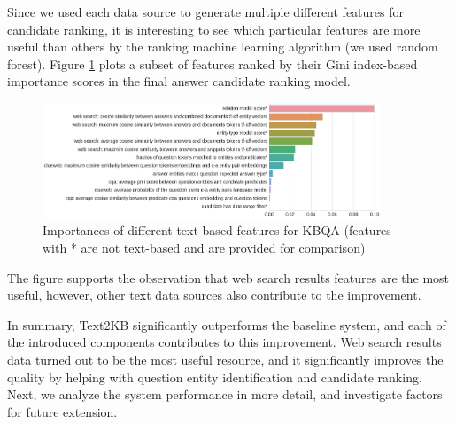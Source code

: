 
Since we used each data source to generate multiple different features for candidate ranking, it is interesting to see which particular features are  more useful than others by the ranking machine learning algorithm (we used random forest).
Figure \ref{fig:feature_importances} plots a subset of features ranked by their Gini index-based importance scores in the final answer candidate ranking model.

\begin{figure}
\centering
\includegraphics[width=0.9\textwidth]{img/feature_importances}
\vspace{-0.5cm}
\caption{Importances of different text-based features for KBQA (features with * are not text-based and are provided for comparison)}
\label{fig:feature_importances}
\end{figure}

The figure supports the observation that web search results features are the most useful, however, other text data sources also contribute to the improvement.

In summary, Text2KB significantly outperforms the baseline system, and each of the introduced components contributes to this improvement.
Web search results data turned out to be the most useful resource, and it significantly improves the quality by helping with question entity identification and candidate ranking.
Next, we analyze the system performance in more detail, and investigate factors for future extension.